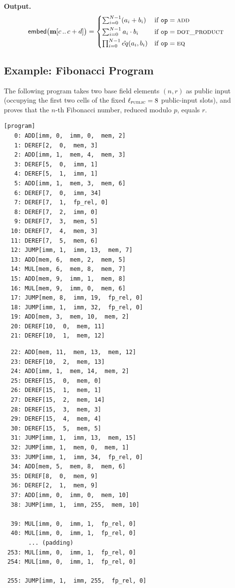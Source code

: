 \documentclass{article}
\theoremstyle{definition}
\newcommand{\extdeg}{d} %
\begin{document}
\textbf{Output.}
\[
\mathsf{embed}\big(\textbf{m}[c \,..\, c + \extdeg]\big) =
\begin{cases}
\sum_{i=0}^{N-1} (a_i + b_i) & \text{if } \texttt{op} = \textsc{add} \\[1mm]
\sum_{i=0}^{N-1} a_i \cdot b_i & \text{if } \texttt{op} = \textsc{dot\_product} \\[1mm]
\prod_{i=0}^{N-1} \hat{eq}(a_i, b_i) & \text{if } \texttt{op} = \textsc{eq}
\end{cases}
\]

\subsection{Example: Fibonacci Program}

The following program takes two base field elements $(n, r)$ as public input (occupying the first two cells of the fixed $\ell_\textsc{public} = 8$ public-input slots), and proves that the $n$-th Fibonacci number, reduced modulo $p$, equals $r$.

\begin{framed}
\small
\noindent
\begin{minipage}[t]{0.48\textwidth}
\begin{verbatim}
[program]
   0: ADD[imm, 0,  imm, 0,  mem, 2]
   1: DEREF[2,  0,  mem, 3]
   2: ADD[imm, 1,  mem, 4,  mem, 3]
   3: DEREF[5,  0,  imm, 1]
   4: DEREF[5,  1,  imm, 1]
   5: ADD[imm, 1,  mem, 3,  mem, 6]
   6: DEREF[7,  0,  imm, 34]
   7: DEREF[7,  1,  fp_rel, 0]
   8: DEREF[7,  2,  imm, 0]
   9: DEREF[7,  3,  mem, 5]
  10: DEREF[7,  4,  mem, 3]
  11: DEREF[7,  5,  mem, 6]
  12: JUMP[imm, 1,  imm, 13,  mem, 7]
  13: ADD[mem, 6,  mem, 2,  mem, 5]
  14: MUL[mem, 6,  mem, 8,  mem, 7]
  15: ADD[mem, 9,  imm, 1,  mem, 8]
  16: MUL[mem, 9,  imm, 0,  mem, 6]
  17: JUMP[mem, 8,  imm, 19,  fp_rel, 0]
  18: JUMP[imm, 1,  imm, 32,  fp_rel, 0]
  19: ADD[mem, 3,  mem, 10,  mem, 2]
  20: DEREF[10,  0,  mem, 11]
  21: DEREF[10,  1,  mem, 12]
\end{verbatim}
\end{minipage}
\hfill
\begin{minipage}[t]{0.48\textwidth}
\begin{verbatim}
  22: ADD[mem, 11,  mem, 13,  mem, 12]
  23: DEREF[10,  2,  mem, 13]
  24: ADD[imm, 1,  mem, 14,  mem, 2]
  25: DEREF[15,  0,  mem, 0]
  26: DEREF[15,  1,  mem, 1]
  27: DEREF[15,  2,  mem, 14]
  28: DEREF[15,  3,  mem, 3]
  29: DEREF[15,  4,  mem, 4]
  30: DEREF[15,  5,  mem, 5]
  31: JUMP[imm, 1,  imm, 13,  mem, 15]
  32: JUMP[imm, 1,  mem, 0,  mem, 1]
  33: JUMP[imm, 1,  imm, 34,  fp_rel, 0]
  34: ADD[mem, 5,  mem, 8,  mem, 6]
  35: DEREF[8,  0,  mem, 9]
  36: DEREF[2,  1,  mem, 9]
  37: ADD[imm, 0,  imm, 0,  mem, 10]
  38: JUMP[imm, 1,  imm, 255,  mem, 10]

  39: MUL[imm, 0,  imm, 1,  fp_rel, 0]
  40: MUL[imm, 0,  imm, 1,  fp_rel, 0]
       ... (padding)
 253: MUL[imm, 0,  imm, 1,  fp_rel, 0]
 254: MUL[imm, 0,  imm, 1,  fp_rel, 0]

 255: JUMP[imm, 1,  imm, 255,  fp_rel, 0]
\end{verbatim}
\end{minipage}
\end{framed}
\end{document}
